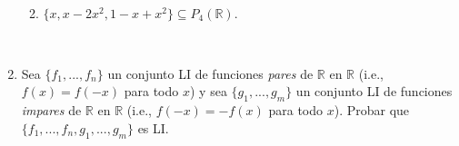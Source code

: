 \documentclass[12pt]{amsart}
\begin{document}
\begin{enumerate}[resume]
\begin{enumerate}
	\
	
	\item $\{x, x-2x^2, 1-x+x^2\} \subseteq P_4(\mathbb{R})$.
\end{enumerate}

\

\item Sea $\{f_1,...,f_n\}$ un conjunto LI de funciones {\it pares} de $\mathbb{R}$ en $\mathbb{R}$ (i.e., $f(x)=f(-x)$ para todo $x$) y sea $\{g_1,...,g_m\}$ un conjunto LI de funciones {\it impares}
de $\mathbb{R}$ en $\mathbb{R}$ (i.e., $f(-x)=-f(x)$ para todo $x$).
Probar que $\{f_1,...,f_n,g_1,...,g_m\}$ es LI.

\end{enumerate}
\end{document}
